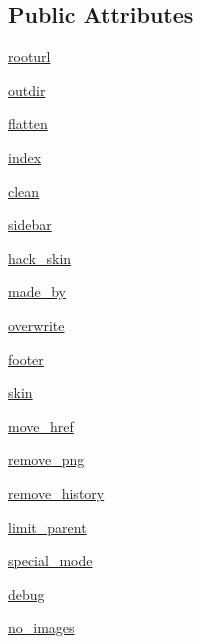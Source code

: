 \subsection*{Public Attributes}
\begin{DoxyCompactItemize}
\item 
\hyperlink{classmw2html_1_1_config_aeb12a940f1165d5abf67ba33dae59d28}{rooturl}
\item 
\hyperlink{classmw2html_1_1_config_ab1b06f551981590e3602ef342c9ec426}{outdir}
\item 
\hyperlink{classmw2html_1_1_config_a68f835fe25e82cb83acfa34d24ea5423}{flatten}
\item 
\hyperlink{classmw2html_1_1_config_a75776ea894bdbc698210723b6f8517fb}{index}
\item 
\hyperlink{classmw2html_1_1_config_ad74110e6433292bc02ca070147951816}{clean}
\item 
\hyperlink{classmw2html_1_1_config_a070def28f1e3b7098a17cd0ce75f92e0}{sidebar}
\item 
\hyperlink{classmw2html_1_1_config_ab8bf3cd002fbe3ea5ae9f2125726f298}{hack\+\_\+skin}
\item 
\hyperlink{classmw2html_1_1_config_a3058302a27e24f9c802abed872d87205}{made\+\_\+by}
\item 
\hyperlink{classmw2html_1_1_config_a43b87fc86f4db7b2a678aa9d4edcc487}{overwrite}
\item 
\hyperlink{classmw2html_1_1_config_ab13184eb1c700ebb989fa355221beb2d}{footer}
\item 
\hyperlink{classmw2html_1_1_config_a2f8db9afd3422531379dbb9795c595be}{skin}
\item 
\hyperlink{classmw2html_1_1_config_ab99ad91cedaf94fb441d15ab539dee61}{move\+\_\+href}
\item 
\hyperlink{classmw2html_1_1_config_acdd599198ca8204d5e5054bb8195882a}{remove\+\_\+png}
\item 
\hyperlink{classmw2html_1_1_config_a98d73e496d59f4e522045095cf2e0f23}{remove\+\_\+history}
\item 
\hyperlink{classmw2html_1_1_config_a8fba2588992ef27b68cecd8b5aa9ee34}{limit\+\_\+parent}
\item 
\hyperlink{classmw2html_1_1_config_a873d1381c06bf818051740e91347054b}{special\+\_\+mode}
\item 
\hyperlink{classmw2html_1_1_config_a52d34b7b74e4216fdedb0db8d01b1ca2}{debug}
\item 
\hyperlink{classmw2html_1_1_config_a6965153fa13b111d48005ebea9e5db40}{no\+\_\+images}
\end{DoxyCompactItemize}


